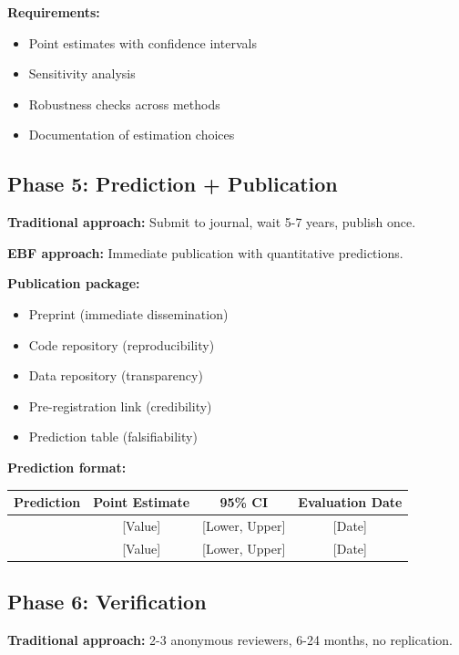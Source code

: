 \textbf{Requirements:}
\begin{itemize}[nosep]
    \item Point estimates with confidence intervals
    \item Sensitivity analysis
    \item Robustness checks across methods
    \item Documentation of estimation choices
\end{itemize}

\subsection{Phase 5: Prediction + Publication}

\textbf{Traditional approach:} Submit to journal, wait 5-7 years, publish once.

\textbf{EBF approach:} Immediate publication with quantitative predictions.

\textbf{Publication package:}
\begin{itemize}[nosep]
    \item Preprint (immediate dissemination)
    \item Code repository (reproducibility)
    \item Data repository (transparency)
    \item Pre-registration link (credibility)
    \item Prediction table (falsifiability)
\end{itemize}

\textbf{Prediction format:}
\begin{center}
\small
\begin{tabular}{@{}lccc@{}}
\toprule
\textbf{Prediction} & \textbf{Point Estimate} & \textbf{95\% CI} & \textbf{Evaluation Date} \\
\midrule
[Outcome 1] & [Value] & [Lower, Upper] & [Date] \\
[Outcome 2] & [Value] & [Lower, Upper] & [Date] \\
\bottomrule
\end{tabular}
\end{center}

\subsection{Phase 6: Verification}

\textbf{Traditional approach:} 2-3 anonymous reviewers, 6-24 months, no replication.

